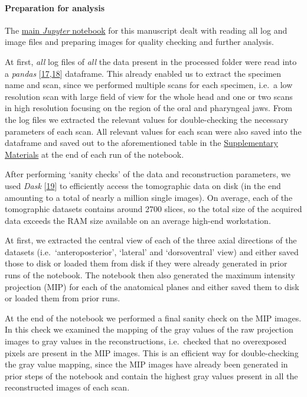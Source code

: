 \hypertarget{preparation-for-analysis}{%
\paragraph{Preparation for analysis}\label{preparation-for-analysis}}

The \href{https://github.com/habi/EAWAG/blob/master/DisplayFishes.ipynb}{main \emph{Jupyter} notebook} for this manuscript dealt with reading all log and image files and preparing images for quality checking and further analysis.

At first, \emph{all} log files of \emph{all} the data present in the processed folder were read into a \emph{pandas} {[}\protect\hyperlink{ref-19qQOHlFN}{17},\protect\hyperlink{ref-U5AcoDOX}{18}{]} dataframe.
This already enabled us to extract the specimen name and scan, since we performed multiple scans for each specimen, i.e.~a low resolution scan with large field of view for the whole head and one or two scans in high resolution focusing on the region of the oral and pharyngeal jaws.
From the log files we extracted the relevant values for double-checking the necessary parameters of each scan.
All relevant values for each scan were also saved into the dataframe and saved out to the aforementioned table in the \protect\hyperlink{supplementary-materials}{Supplementary Materials} at the end of each run of the notebook.

After performing `sanity checks' of the data and reconstruction parameters, we used \emph{Dask} {[}\protect\hyperlink{ref-hj1CnyWB}{19}{]} to efficiently access the tomographic data on disk (in the end amounting to a total of nearly a million single images).
On average, each of the tomographic datasets contains around 2700 slices, so the total size of the acquired data exceeds the RAM size available on an average high-end workstation.

At first, we extracted the central view of each of the three axial directions of the datasets (i.e.~`anteroposterior', `lateral' and `dorsoventral' view) and either saved those to disk or loaded them from disk if they were already generated in prior runs of the notebook.
The notebook then also generated the maximum intensity projection (MIP) for each of the anatomical planes and either saved them to disk or loaded them from prior runs.

At the end of the notebook we performed a final sanity check on the MIP images.
In this check we examined the mapping of the gray values of the raw projection images to gray values in the reconstructions, i.e.~checked that no overexposed pixels are present in the MIP images.
This is an efficient way for double-checking the gray value mapping, since the MIP images have already been generated in prior steps of the notebook and contain the highest gray values present in all the reconstructed images of each scan.

